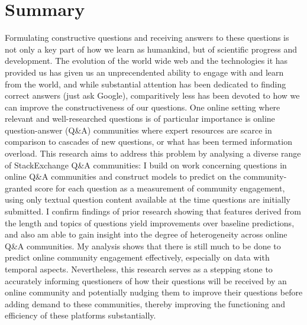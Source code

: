 \documentclass[11pt,preprint, authoryear]{article}
\title{
{\scshape\Large Department of Statistics 2019}\\
{\vskip 2.5em \scshape Predicting Community Engagement with Questions Across Online
Question-Answer Fora}\\
}
\author{Candidate Number: 10140}
\subtitle{\vspace{4em} Submitted for the Master of Science, London School of Economics,
University of London} %
\date{\scshape August 2019}
\numberwithin{equation}{section}
\begin{document}
\pagestyle{fancy}
\chead{}
\rhead{}
\lfoot{}
\rfoot{} 
\lhead{}
\cfoot{\footnotesize \thepage\\}


\maketitle

\thispagestyle{empty}

\clearpage

\setcounter{page}{1}

\renewcommand{\contentsname}{Table of Contents}
\hypersetup{linkcolor=black}
\tableofcontents
\newpage
\hypersetup{linkcolor=black}
\listoffigures
\newpage
\hypersetup{linkcolor=black}
\listoftables
\hypersetup{linkcolor=black}
\newpage

\section*{Summary}

Formulating constructive questions and receiving answers to these
questions is not only a key part of how we learn as humankind, but of
scientific progress and development. The evolution of the world wide web
and the technologies it has provided us has given us an unprecendented
ability to engage with and learn from the world, and while substantial
attention has been dedicated to finding correct answers (just ask
Google), comparitively less has been devoted to how we can improve the
constructiveness of our questions. One online setting where relevant and
well-researched questions is of particular importance is online
question-answer (Q\&A) communities where expert resources are scarce in
comparison to cascades of new questions, or what has been termed
information overload. This research aims to address this problem by
analysing a diverse range of StackExchange Q\&A communities: I build on
work concerning questions in online Q\&A communities and construct
models to predict on the community-granted score for each question as a
measurement of community engagement, using only textual question content
available at the time questions are initially submitted. I confirm
findings of prior research showing that features derived from the length
and topics of questions yield improvements over baseline predictions,
and also am able to gain insight into the degree of heterogeneity across
online Q\&A communities. My analysis shows that there is still much to
be done to predict online community engagement effectively, especially
on data with temporal aspects. Nevertheless, this research serves as a
stepping stone to accurately informing questioners of how their
questions will be received by an online community and potentially
nudging them to improve their questions before adding demand to these
communities, thereby improving the functioning and efficiency of these
platforms substantially.
\end{document}
